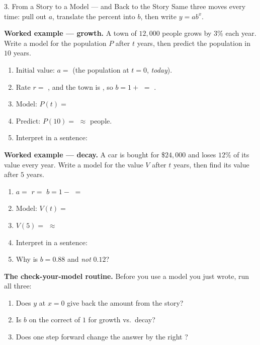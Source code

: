 \documentclass[10pt]{article}
\begin{document}
\begin{notesbox}{3. From a Story to a Model --- and Back to the Story}
Same three moves every time: pull out $a$, translate the percent into $b$, then write $y=ab^{x}$.

\vspace{4pt}
\textbf{Worked example --- growth.} A town of $12{,}000$ people grows by $3\%$ each year. Write a
model for the population $P$ after $t$ years, then predict the population in $10$ years.
\begin{enumerate}[leftmargin=1.7em, itemsep=3pt]
  \item Initial value: $a=$ \blank{1.8cm} \quad (the population at $t=0$, \emph{today}).
  \item Rate $r=$ \blank{1.2cm}, and the town is \blank{1.8cm}, so
        $b=1+$ \blank{1.0cm} $=$ \blank{1.2cm}.
  \item Model: $P(t)=$ \blank{3.4cm}
  \item Predict: $P(10)=$ \blank{5.0cm} $\approx$ \blank{2.0cm} people.
  \item Interpret in a sentence: \writeline
\end{enumerate}

\vspace{3pt}
\textbf{Worked example --- decay.} A car is bought for \$$24{,}000$ and loses $12\%$ of its value
every year. Write a model for the value $V$ after $t$ years, then find its value after $5$ years.
\begin{enumerate}[leftmargin=1.7em, itemsep=3pt]
  \item $a=$ \blank{1.8cm} \quad $r=$ \blank{1.2cm} \quad
        $b=1-$ \blank{1.0cm} $=$ \blank{1.2cm}
  \item Model: $V(t)=$ \blank{3.4cm}
  \item $V(5)=$ \blank{5.0cm} $\approx$ \blank{2.0cm}
  \item Interpret in a sentence: \writeline
  \item Why is $b=0.88$ and \emph{not} $0.12$? \writeline
\end{enumerate}

\vspace{2pt}
\textbf{The check-your-model routine.} Before you use a model you just wrote, run all three:
\begin{enumerate}[label=(\arabic*), leftmargin=1.9em, itemsep=2pt]
  \item Does $y$ at $x=0$ give back the \blank{2.4cm} amount from the story?
  \item Is $b$ on the correct \blank{1.6cm} of $1$ for growth vs.\ decay?
  \item Does one step forward change the answer by the right \blank{2.0cm}?
\end{enumerate}
\end{notesbox}
\end{document}
